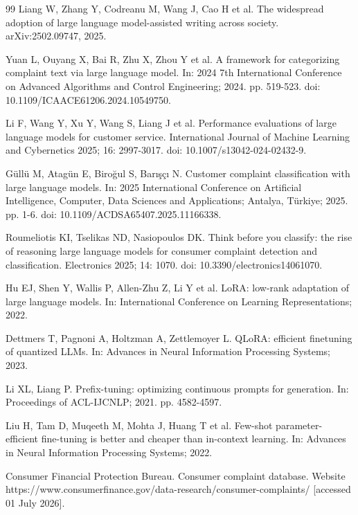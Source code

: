 \documentclass{elektr}
\begin{document}
\begin{thebibliography}{99}
 Liang W, Zhang Y, Codreanu M, Wang J, Cao H et al. The widespread adoption of large language model-assisted writing across society. arXiv:2502.09747, 2025.

 Yuan L, Ouyang X, Bai R, Zhu X, Zhou Y et al. A framework for categorizing complaint text via large language model. In: 2024 7th International Conference on Advanced Algorithms and Control Engineering; 2024. pp. 519-523. doi: 10.1109/ICAACE61206.2024.10549750.

 Li F, Wang Y, Xu Y, Wang S, Liang J et al. Performance evaluations of large language models for customer service. International Journal of Machine Learning and Cybernetics 2025; 16: 2997-3017. doi: 10.1007/s13042-024-02432-9.

 Güllü M, Atagün E, Biroğul S, Barışçı N. Customer complaint classification with large language models. In: 2025 International Conference on Artificial Intelligence, Computer, Data Sciences and Applications; Antalya, Türkiye; 2025. pp. 1-6. doi: 10.1109/ACDSA65407.2025.11166338.

 Roumeliotis KI, Tselikas ND, Nasiopoulos DK. Think before you classify: the rise of reasoning large language models for consumer complaint detection and classification. Electronics 2025; 14: 1070. doi: 10.3390/electronics14061070.

 Hu EJ, Shen Y, Wallis P, Allen-Zhu Z, Li Y et al. LoRA: low-rank adaptation of large language models. In: International Conference on Learning Representations; 2022.

 Dettmers T, Pagnoni A, Holtzman A, Zettlemoyer L. QLoRA: efficient finetuning of quantized LLMs. In: Advances in Neural Information Processing Systems; 2023.

 Li XL, Liang P. Prefix-tuning: optimizing continuous prompts for generation. In: Proceedings of ACL-IJCNLP; 2021. pp. 4582-4597.

 Liu H, Tam D, Muqeeth M, Mohta J, Huang T et al. Few-shot parameter-efficient fine-tuning is better and cheaper than in-context learning. In: Advances in Neural Information Processing Systems; 2022.

 Consumer Financial Protection Bureau. Consumer complaint database. Website https://www.consumerfinance.gov/data-research/consumer-complaints/ [accessed 01 July 2026].


\end{thebibliography}
\end{document}
